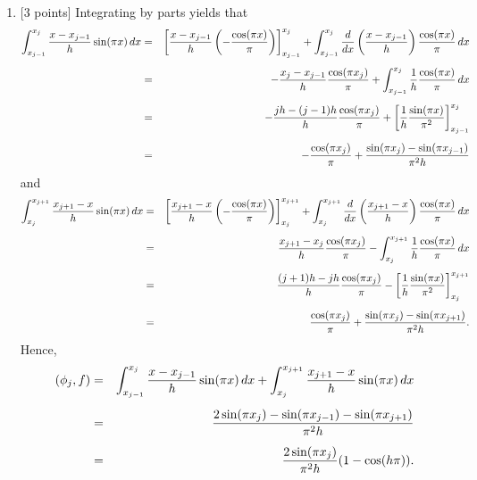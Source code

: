 \begin{solution}
\begin{enumerate}
\item {[3 points]} Integrating by parts yields that
          \begin{eqnarray*}
\int_{x_{j-1}}^{x_j} {x-x_{j-1} \over h} \sin(\pi x)\, dx&=&\left[{x-x_{j-1} \over h}\left(-{\cos(\pi x) \over \pi}\right)\right]_{x_{j-1}}^{x_j}+\int_{x_{j-1}}^{x_j}\frac{d}{dx}\left({x-x_{j-1} \over h}\right) {\cos(\pi x) \over \pi}\, dx \\[0.5em]
&=&-{x_j-x_{j-1} \over h}{\cos(\pi x_j) \over \pi}+\int_{x_{j-1}}^{x_j}{1 \over h}{\cos(\pi x) \over \pi}\, dx\\[0.5em]
&=&-{jh-(j-1)h \over h}{\cos(\pi x_j) \over \pi}+\left[{1 \over h}{\sin(\pi x) \over \pi^2}\right]_{x_{j-1}}^{x_j}\\[0.5em]
&=&-{\cos(\pi x_j) \over \pi}+{\sin(\pi x_j)-\sin(\pi x_{j-1}) \over \pi^2h}
         \end{eqnarray*} 
and
          \begin{eqnarray*}
\int_{x_j}^{x_{j+1}} {x_{j+1}-x \over h} \sin(\pi x)\, dx&=&\left[{x_{j+1}-x \over h}\left(-{\cos(\pi x) \over \pi}\right)\right]_{x_j}^{x_{j+1}}+\int_{x_j}^{x_{j+1}}\frac{d}{dx}\left({x_{j+1}-x \over h}\right) {\cos(\pi x) \over \pi}\, dx \\[0.5em]
&=&{x_{j+1}-x_j \over h}{\cos(\pi x_j) \over \pi}-\int_{x_j}^{x_{j+1}}{1 \over h}{\cos(\pi x) \over \pi}\, dx\\[0.5em]
&=&{(j+1)h-jh \over h}{\cos(\pi x_j) \over \pi}-\left[{1 \over h}{\sin(\pi x) \over \pi^2}\right]_{x_j}^{x_{j+1}}\\[0.5em]
&=&{\cos(\pi x_j) \over \pi}+{\sin(\pi x_j)-\sin(\pi x_{j+1}) \over \pi^2h}.
         \end{eqnarray*} 
Hence,
          \begin{eqnarray*}
              (\phi_j, f) &=& \int_{x_{j-1}}^{x_j} {x-x_{j-1} \over h} \sin(\pi x)\, dx
                              + \int_{x_j}^{x_{j+1}} {x_{j+1}-x \over h} \sin(\pi x)\, dx \\[0.5em]
                             &=& {2 \sin(\pi x_j) - \sin(\pi x_{j-1}) - \sin(\pi x_{j+1}) 
                                   \over \pi^2 h} \\[0.5em]
                             &=& {2\sin(\pi x_j) \over \pi^2 h} (1 - \cos(h\pi)).
         \end{eqnarray*} 


\end{enumerate}
\end{solution}
